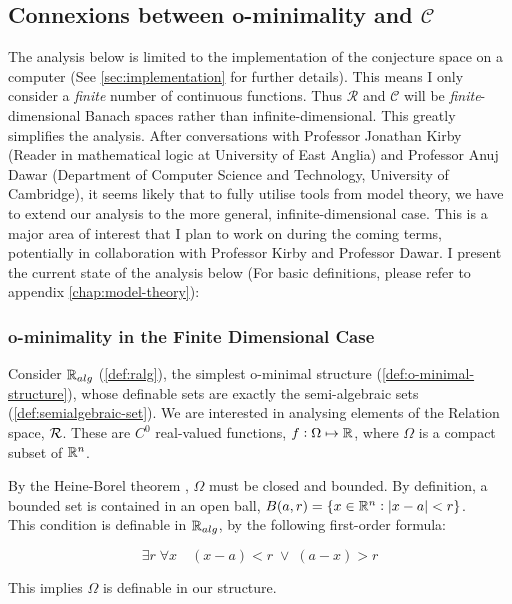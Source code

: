 % 
\subsection{Connexions between o-minimality and \texorpdfstring{$\mathcal{C}$}{C}}
\label{sec:ominimal-connexions}
The analysis below is limited to the implementation of the conjecture space
on a computer (See \ref{sec:implementation} for further details). This means I only consider a \textit{finite} number of continuous functions. Thus $\mathcal{R}$ and $\mathcal{C}$ will be \textit{finite}-dimensional Banach spaces rather than infinite-dimensional. This greatly simplifies the analysis. After conversations with Professor Jonathan Kirby (Reader in mathematical logic at University of East Anglia) and Professor Anuj Dawar (Department of Computer Science and Technology, University of Cambridge), it seems likely that to fully utilise tools from model theory, we have to extend our analysis to the more general, infinite-dimensional case.
This is a major area of interest that I plan to work on during the coming terms, potentially in collaboration with Professor Kirby and Professor Dawar. I present the current state of the analysis below (For basic definitions, please refer to appendix \ref{chap:model-theory}):

\subsubsection{o-minimality in the Finite Dimensional Case}
Consider $\mathbb{R}_{alg}$ (\ref{def:ralg}), the simplest o-minimal structure (\ref{def:o-minimal-structure}), whose definable sets are exactly the semi-algebraic sets (\ref{def:semialgebraic-set}). We are interested in analysing elements of the Relation space, $\mathcal{R}$.
These are $C^0$ real-valued functions, $f:\Omega\mapsto\mathbb{R}$, where $\Omega$ is a compact subset of $\mathbb{R}^n$.

By the Heine-Borel theorem \cite{Caradus_1967}, $\Omega$ must be closed and bounded. By definition, a bounded set is contained in an open ball, $B(a,r) = \{x\in\mathbb{R}^n:|x - a| < r\}$. \\ This condition is definable in $\mathbb{R}_{alg}$, by the following first-order formula:

\begin{equation*}
    \exists r\;\forall x \quad (x - a) < r\; \vee \; (a - x) > r
\end{equation*}

This implies $\Omega$ is definable in our structure.


